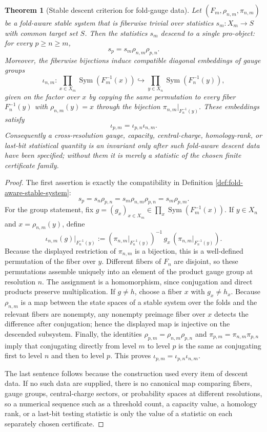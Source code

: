 \documentclass[12pt,a4paper]{article}
\theoremstyle{plain}
\newtheorem{theorem}{Theorem}[section]
\theoremstyle{definition}
\numberwithin{equation}{section}
\DeclareMathOperator{\Sym}{Sym}
\begin{document}
\begin{theorem}[Stable descent criterion for fold-gauge data]\label{thm:fold-aware-stable-descent}
Let \((F_m,\rho_{n,m},\pi_{n,m})\) be a fold-aware stable system that is fiberwise trivial over statistics \(s_m:X_m\to S\) with common target set \(S\).  Then the statistics \(s_m\) descend to a single pro-object: for every \(p\ge n\ge m\),
\[
s_p=s_m\rho_{n,m}\rho_{p,n}.
\]
Moreover, the fiberwise bijections induce compatible diagonal embeddings of gauge groups
\[
\iota_{n,m}:\prod_{x\in X_m}\Sym(F_m^{-1}(x))
\hookrightarrow
\prod_{y\in X_n}\Sym(F_n^{-1}(y)),
\]
given on the factor over \(x\) by copying the same permutation to every fiber \(F_n^{-1}(y)\) with \(\rho_{n,m}(y)=x\) through the bijection \(\pi_{n,m}|_{F_n^{-1}(y)}\).  These embeddings satisfy
\[
\iota_{p,m}=\iota_{p,n}\iota_{n,m}.
\]
Consequently a cross-resolution gauge, capacity, central-charge, homology-rank, or last-bit statistical quantity is an invariant only after such fold-aware descent data have been specified; without them it is merely a statistic of the chosen finite certificate family.
\end{theorem}
\begin{proof}
The first assertion is exactly the compatibility in Definition \ref{def:fold-aware-stable-system}:
\[
s_p=s_n\rho_{p,n}=s_m\rho_{n,m}\rho_{p,n}=s_m\rho_{p,m}.
\]
For the group statement, fix \(g=(g_x)_{x\in X_m}\in\prod_x\Sym(F_m^{-1}(x))\).  If \(y\in X_n\) and \(x=\rho_{n,m}(y)\), define
\[
\iota_{n,m}(g)|_{F_n^{-1}(y)}
:=(\pi_{n,m}|_{F_n^{-1}(y)})^{-1}\,g_x\,(\pi_{n,m}|_{F_n^{-1}(y)}).
\]
Because the displayed restriction of \(\pi_{n,m}\) is a bijection, this is a well-defined permutation of the fiber over \(y\).  Different fibers of \(F_n\) are disjoint, so these permutations assemble uniquely into an element of the product gauge group at resolution \(n\).  The assignment is a homomorphism, since conjugation and direct products preserve multiplication.  If \(g\ne h\), choose a fiber \(x\) with \(g_x\ne h_x\).  Because \(\rho_{n,m}\) is a map between the state spaces of a stable system over the folds and the relevant fibers are nonempty, any nonempty preimage fiber over \(x\) detects the difference after conjugation; hence the displayed map is injective on the descended subsystem.  Finally, the identities \(\rho_{p,m}=\rho_{n,m}\rho_{p,n}\) and \(\pi_{p,m}=\pi_{n,m}\pi_{p,n}\) imply that conjugating directly from level \(m\) to level \(p\) is the same as conjugating first to level \(n\) and then to level \(p\).  This proves \(\iota_{p,m}=\iota_{p,n}\iota_{n,m}\).

The last sentence follows because the construction used every item of descent data.  If no such data are supplied, there is no canonical map comparing fibers, gauge groups, central-charge sectors, or probability spaces at different resolutions, so a numerical sequence such as a threshold count, a capacity value, a homology rank, or a last-bit testing statistic is only the value of a statistic on each separately chosen certificate. \qedhere
\end{proof}
\end{document}
